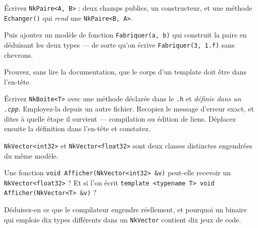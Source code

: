 \begin{nkpratique}
Écrivez \texttt{NkPaire<A, B>} : deux champs publics, un constructeur, et une
méthode \texttt{Echanger()} qui \emph{rend} une \texttt{NkPaire<B, A>}.

Puis ajoutez un modèle de fonction \texttt{Fabriquer(a, b)} qui construit la
paire en déduisant les deux types --- de sorte qu'on écrive
\texttt{Fabriquer(3, 1.f)} sans chevrons.
\end{nkpratique}

\begin{nkdemo}
Prouvez, sans lire la documentation, que le corps d'un template doit être dans
l'en-tête.

Écrivez \texttt{NkBoite<T>} avec une méthode déclarée dans le \texttt{.h} et
\emph{définie dans un \texttt{.cpp}}. Employez-la depuis un autre fichier.
Recopiez le message d'erreur exact, et dites à quelle étape il survient ---
compilation ou édition de liens. Déplacez ensuite la définition dans l'en-tête et
constatez.
\end{nkdemo}

\begin{nklogique}
\texttt{NkVector<int32>} et \texttt{NkVector<float32>} sont deux classes
distinctes engendrées du même modèle.

Une fonction \texttt{void Afficher(NkVector<int32> \&v)} peut-elle recevoir un
\texttt{NkVector<float32>} ? Et si l'on écrit
\texttt{template <typename T> void Afficher(NkVector<T> \&v)} ?

Déduisez-en ce que le compilateur engendre réellement, et pourquoi un binaire qui
emploie dix types différents dans un \texttt{NkVector} contient dix jeux de code.
\end{nklogique}
